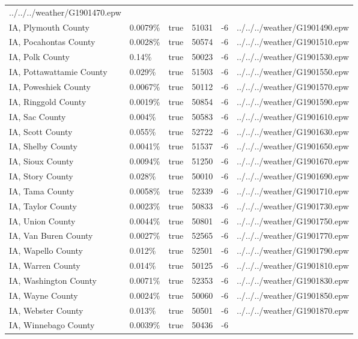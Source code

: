 \begin{longtable}[]{@{}llllll@{}}
../../../weather/G1901470.epw \\
IA, Plymouth County & 0.0079\% & true & 51031 & -6 &
../../../weather/G1901490.epw \\
IA, Pocahontas County & 0.0028\% & true & 50574 & -6 &
../../../weather/G1901510.epw \\
IA, Polk County & 0.14\% & true & 50023 & -6 &
../../../weather/G1901530.epw \\
IA, Pottawattamie County & 0.029\% & true & 51503 & -6 &
../../../weather/G1901550.epw \\
IA, Poweshiek County & 0.0067\% & true & 50112 & -6 &
../../../weather/G1901570.epw \\
IA, Ringgold County & 0.0019\% & true & 50854 & -6 &
../../../weather/G1901590.epw \\
IA, Sac County & 0.004\% & true & 50583 & -6 &
../../../weather/G1901610.epw \\
IA, Scott County & 0.055\% & true & 52722 & -6 &
../../../weather/G1901630.epw \\
IA, Shelby County & 0.0041\% & true & 51537 & -6 &
../../../weather/G1901650.epw \\
IA, Sioux County & 0.0094\% & true & 51250 & -6 &
../../../weather/G1901670.epw \\
IA, Story County & 0.028\% & true & 50010 & -6 &
../../../weather/G1901690.epw \\
IA, Tama County & 0.0058\% & true & 52339 & -6 &
../../../weather/G1901710.epw \\
IA, Taylor County & 0.0023\% & true & 50833 & -6 &
../../../weather/G1901730.epw \\
IA, Union County & 0.0044\% & true & 50801 & -6 &
../../../weather/G1901750.epw \\
IA, Van Buren County & 0.0027\% & true & 52565 & -6 &
../../../weather/G1901770.epw \\
IA, Wapello County & 0.012\% & true & 52501 & -6 &
../../../weather/G1901790.epw \\
IA, Warren County & 0.014\% & true & 50125 & -6 &
../../../weather/G1901810.epw \\
IA, Washington County & 0.0071\% & true & 52353 & -6 &
../../../weather/G1901830.epw \\
IA, Wayne County & 0.0024\% & true & 50060 & -6 &
../../../weather/G1901850.epw \\
IA, Webster County & 0.013\% & true & 50501 & -6 &
../../../weather/G1901870.epw \\
IA, Winnebago County & 0.0039\% & true & 50436 & -6 &

\end{longtable}
